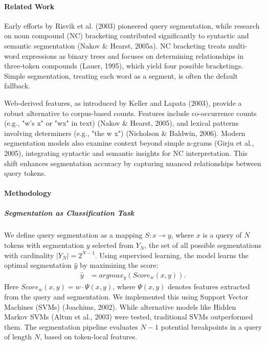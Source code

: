 \paragraph*{Related Work}
Early efforts by Risvik et al. (2003) pioneered query segmentation, while research on noun compound (NC) bracketing contributed significantly to syntactic and semantic segmentation (Nakov \& Hearst, 2005a). NC bracketing treats multi-word expressions as binary trees and focuses on determining relationships in three-token compounds (Lauer, 1995), which yield four possible bracketings. Simple segmentation, treating each word as a segment, is often the default fallback.

Web-derived features, as introduced by Keller and Lapata (2003), provide a robust alternative to corpus-based counts. Features include co-occurrence counts (e.g., "w's x" or "wx" in text) (Nakov \& Hearst, 2005), and lexical patterns involving determiners (e.g., "the w x") (Nicholson \& Baldwin, 2006). Modern segmentation models also examine context beyond simple n-grams (Girju et al., 2005), integrating syntactic and semantic insights for NC interpretation. This shift enhances segmentation accuracy by capturing nuanced relationships between query tokens.

\paragraph*{Methodology}
\subparagraph*{\textbf{Segmentation as Classification Task}}
We define query segmentation as a mapping $S: x \to y$, where $x$ is a query of $N$ tokens with segmentation $y$ selected from $Y_N$, the set of all possible segmentations with cardinality $|Y_N| = 2^{N-1}$. Using supervised learning, the model learns the optimal segmentation $\hat{y}$ by maximizing the score:
\begin{align*}
	\hat{y} &= argmax_y(Score_w(x,y)).
\end{align*}
Here $Score_w(x,y) = w \cdot \Psi(x,y)$, where $\Psi(x,y)$ denotes features extracted from the query and segmentation. We implemented this using Support Vector Machines (SVMs) (Joachims, 2002). While alternative models like Hidden Markov SVMs (Altun et al., 2003) were tested, traditional SVMs outperformed them. The segmentation pipeline evaluates $N-1$ potential breakpoints in a query of length $N$, based on token-local features.

